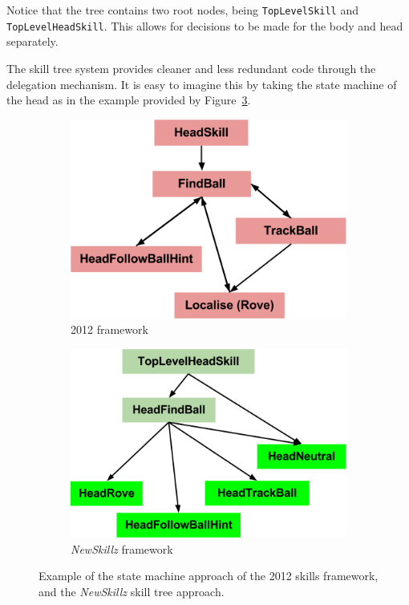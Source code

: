 Notice that the tree contains two root nodes, being \texttt{TopLevelSkill} and \texttt{TopLevelHeadSkill}. This allows for decisions to be made for the body and head separately.

The skill tree system provides cleaner and less redundant code through the delegation mechanism. It is easy to imagine this by taking the state machine of the head as in the example provided by Figure~\ref{fig:state_machine}.

\begin{figure}[h]
\centering
\begin{subfigure}{0.45\textwidth}
  \centering
  \includegraphics[width=\textwidth]{img/state_machine_old.png}
  \caption{2012 framework}
  \label{fig:state_machine_old}
\end{subfigure}
\begin{subfigure}{0.45\textwidth}
  \centering
  \includegraphics[width=\textwidth]{img/state_machine_newskillz.png}
  \caption{\textit{NewSkillz} framework}
  \label{fig:state_machine_newskillz}
\end{subfigure}
\caption{Example of the state machine approach of the 2012 skills framework, and the \textit{NewSkillz} skill tree approach.}
\label{fig:state_machine}
\end{figure}

